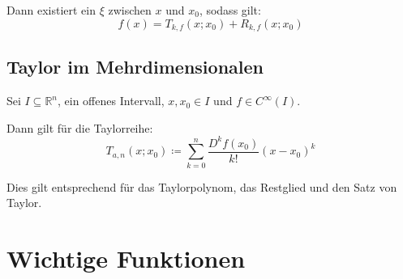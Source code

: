 \documentclass[a4paper, 11pt, accentcolor = tud3b]{tudreport}
\begin{document}
                Dann existiert ein $ \xi $ zwischen $ x $ und $ x _ 0 $, sodass gilt:
                \begin{equation*}
                    f(x) = T _ { k, f } (x; x _ 0) + R _ { k, f } (x; x _ 0)
                \end{equation*}

            \subsection{Taylor im Mehrdimensionalen}
                Sei $ I \subseteq \mathbb{R} ^ n $, ein offenes Intervall, $ x, x _ 0 \in I $ und $ f \in C ^ \infty (I) $.

                Dann gilt für die Taylorreihe:
                \begin{equation*}
                    T _ {a, n} (x; x _ 0) \coloneqq \sum _ { k = 0 } ^ n \frac{D ^ k f(x _ 0)}{k!} (x - x _ 0) ^ k
                \end{equation*}

                Dies gilt entsprechend für das Taylorpolynom, das Restglied und den Satz von Taylor.

        \section{Wichtige Funktionen}
            \label{sec:wichtige_funktionen}
\end{document}

